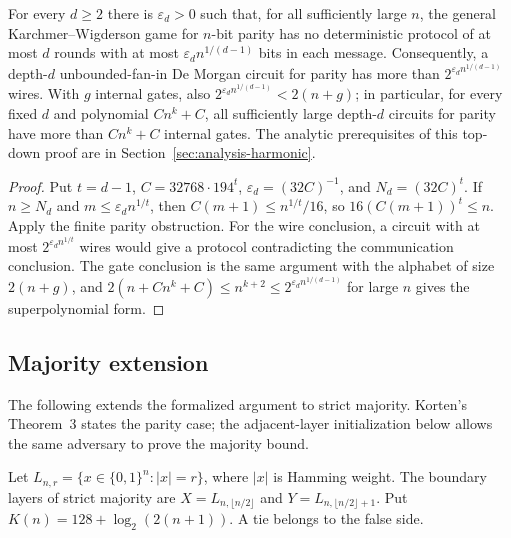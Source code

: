\begin{theorem}
  \label{thm:lowerbounds-korten-topdown}
  \leanok
  For every $d\ge2$ there is $\varepsilon_d>0$ such that, for all sufficiently
  large $n$, the general Karchmer--Wigderson game for $n$-bit parity has no
  deterministic protocol of at most $d$ rounds with at most
  $\varepsilon_d n^{1/(d-1)}$ bits in each message. Consequently, a depth-$d$
  unbounded-fan-in De Morgan circuit for parity has more than
  $2^{\varepsilon_d n^{1/(d-1)}}$ wires.
  With $g$ internal gates, also $2^{\varepsilon_d n^{1/(d-1)}} < 2(n + g)$;
  in particular, for every fixed $d$ and polynomial $Cn^k + C$, all
  sufficiently large depth-$d$ circuits for parity have more than $Cn^k + C$
  internal gates.
  The analytic prerequisites of this top-down proof are in
  Section~\ref{sec:analysis-harmonic}.
\end{theorem}
\begin{proof}
  \leanok
  Put $t=d-1$, $C=32768\cdot194^t$, $\varepsilon_d=(32C)^{-1}$, and
  $N_d=(32C)^t$. If $n\ge N_d$ and $m\le\varepsilon_d n^{1/t}$,
  then $C(m+1)\le n^{1/t}/16$, so $16(C(m+1))^t\le n$.
  Apply the finite parity obstruction. For the wire conclusion, a
  circuit with at most $2^{\varepsilon_d n^{1/t}}$ wires would give a
  protocol contradicting the communication conclusion.
  The gate conclusion is the same argument with the alphabet of size
  $2(n+g)$, and $2(n + Cn^k + C) \le n^{k+2} \le 2^{\varepsilon_d n^{1/(d-1)}}$
  for large $n$ gives the superpolynomial form.
\end{proof}

\subsection{Majority extension}

The following extends the formalized argument to strict majority. Korten's
Theorem~3 states the parity case; the adjacent-layer initialization below
allows the same adversary to prove the majority bound.

\begin{definition}
  \label{def:lowerbounds-majority-layers}
  \leanok
  Let $L_{n,r}=\{x\in\{0,1\}^n:|x|=r\}$, where $|x|$ is Hamming weight.
  The boundary layers of strict majority are
  $X=L_{n,\lfloor n/2\rfloor}$ and $Y=L_{n,\lfloor n/2\rfloor+1}$.
  Put $K(n)=128+\log_2(2(n+1))$. A tie belongs to the false side.
\end{definition}

